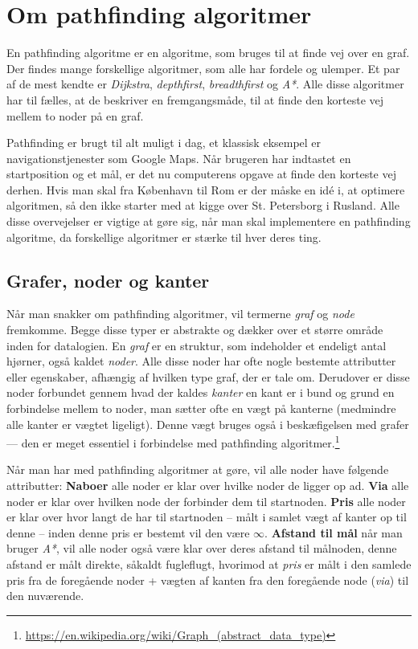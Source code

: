 \documentclass[a4paper, 12pt]{article}
\begin{document}
\newpage
\section{Om pathfinding algoritmer}
En pathfinding algoritme er en algoritme, som bruges til at finde vej over en graf. Der findes mange forskellige algoritmer, som alle har fordele og ulemper. Et par af de mest kendte er \textit{Dijkstra}, \textit{depthfirst}, \textit{breadthfirst} og \textit{A*}. Alle disse algoritmer har til fælles, at de beskriver en fremgangsmåde, til at finde den korteste vej mellem to noder på en graf.\par
Pathfinding er brugt til alt muligt i dag, et klassisk eksempel er navigationstjenester som Google Maps. Når brugeren har indtastet en startposition og et mål, er det nu computerens opgave at finde den korteste vej derhen. Hvis man skal fra København til Rom er der måske en idé i, at optimere algoritmen, så den ikke starter med at kigge over St. Petersborg i Rusland. Alle disse overvejelser er vigtige at gøre sig, når man skal implementere en pathfinding algoritme, da forskellige algoritmer er stærke til hver deres ting.

\subsection{Grafer, noder og kanter}
Når man snakker om pathfinding algoritmer, vil termerne \textit{graf} og \textit{node} fremkomme. Begge disse typer er abstrakte og dækker over et større område inden for datalogien. En \textit{graf} er en struktur, som indeholder et endeligt antal hjørner, også kaldet \textit{noder}. Alle disse noder har ofte nogle bestemte attributter eller egenskaber, afhængig af hvilken type graf, der er tale om. Derudover er disse noder forbundet gennem hvad der kaldes \textit{kanter} en kant er i bund og grund en forbindelse mellem to noder, man sætter ofte en vægt på kanterne (medmindre alle kanter er vægtet ligeligt). Denne vægt bruges også i beskæfigelsen med grafer --- den er meget essentiel i forbindelse med pathfinding algoritmer.\footnote{\url{https://en.wikipedia.org/wiki/Graph_(abstract_data_type)}}\par %
Når man har med pathfinding algoritmer at gøre, vil alle noder have følgende attributter: \textbf{Naboer} alle noder er klar over hvilke noder de ligger op ad. \textbf{Via} alle noder er klar over hvilken node der forbinder dem til startnoden. \textbf{Pris} alle noder er klar over hvor langt de har til startnoden -- målt i samlet vægt af kanter op til denne -- inden denne pris er bestemt vil den være \(\infty\). \textbf{Afstand til mål} når man bruger \textit{A*}, vil alle noder også være klar over deres afstand til målnoden, denne afstand er målt direkte, såkaldt fugleflugt, hvorimod at \textit{pris} er målt i den samlede pris fra de foregående noder + vægten af kanten fra den foregående node (\textit{via}) til den nuværende.
\end{document}
